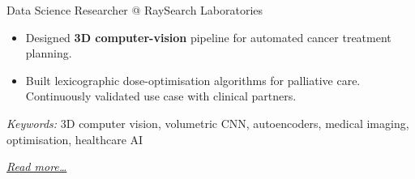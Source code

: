 \large{Data Science Researcher @ RaySearch Laboratories}

\normalsize
\begin{itemize}
    \item Designed \textbf{3D computer-vision} pipeline for automated cancer treatment planning.
    \item Built lexicographic dose-optimisation algorithms for palliative care. Continuously validated use case with clinical partners.
\end{itemize}

\small{\textit{Keywords:} 3D computer vision, volumetric CNN, autoencoders, medical imaging, optimisation, healthcare AI}

\hfill{\small{\textit{\hyperref[sec:raysearch]{Read more…}}}}

